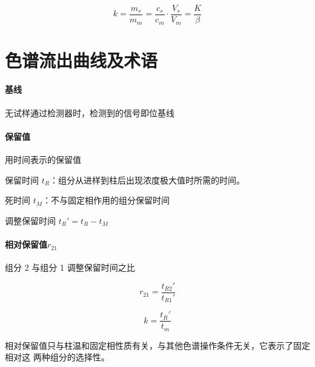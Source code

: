 \begin{equation}
    k = \frac{m_s}{m_m} = \frac{c_s}{c_m} \cdot \frac{V_s}{V_m} = \frac{K}{\beta}
\end{equation}


\section{色谱流出曲线及术语}

\paragraph{基线} 无试样通过检测器时，检测到的信号即位基线

\paragraph{保留值} 用时间表示的保留值

保留时间 $t_R$：组分从进样到柱后出现浓度极大值时所需的时间。

死时间 $t_M$：不与固定相作用的组分保留时间

调整保留时间 $t_R' = t_R - t_M$

\paragraph{相对保留值$r_{21}$} 组分 2 与组分 1 调整保留时间之比

\begin{equation}
    r_{21} = \frac{t_{R2}'}{t_{R1}'}
\end{equation}

\begin{equation}
    k = \frac{t_R'}{t_m}
\end{equation}


相对保留值只与柱温和固定相性质有关，与其他色谱操作条件无关，它表示了固定相对这
两种组分的选择性。
